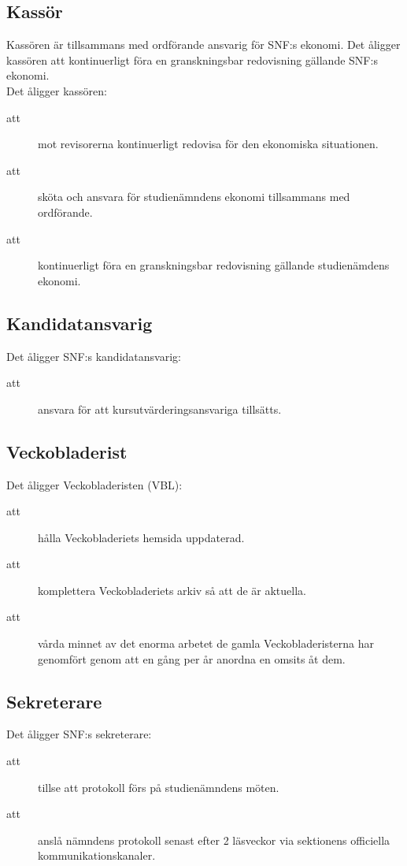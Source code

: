 \documentclass[a4paper]{article}
\begin{document}
\begin{foreningenv}{\forening{}}
    \subsection{Kassör}
    Kassören är tillsammans med ordförande ansvarig för SNF:s ekonomi. Det åligger kassören att kontinuerligt föra en granskningsbar redovisning gällande SNF:s ekonomi.\\
    
    Det åligger kassören:
    \begin{description}
        \item[att] mot revisorerna kontinuerligt redovisa för den ekonomiska situationen.
        \item[att] sköta och ansvara för studienämndens ekonomi tillsammans med ordförande.
        \item[att] kontinuerligt föra en granskningsbar redovisning gällande studienämdens ekonomi.
    \end{description}
    
    \subsection{Kandidatansvarig}
    Det åligger SNF:s kandidatansvarig:
    \begin{description}
          \item[att] ansvara för att kursutvärderingsansvariga tillsätts.
    \end{description}
    
    \subsection{Veckobladerist}
    Det åligger Veckobladeristen (VBL):
    \begin{description}
          \item[att] hålla Veckobladeriets hemsida uppdaterad.
          \item[att] komplettera Veckobladeriets arkiv så att de är aktuella.
          \item[att] vårda minnet av det enorma arbetet de gamla Veckobladeristerna har genomfört genom att en gång per år anordna en omsits åt dem. 
    \end{description}
    
    \subsection{Sekreterare}
    Det åligger SNF:s sekreterare:
    \begin{description}
        \item[att] tillse att protokoll förs på studienämndens möten.
        \item[att] anslå nämndens protokoll senast efter 2 läsveckor via sektionens officiella kommunikationskanaler. 
    \end{description}
    

\end{foreningenv}
\end{document}
